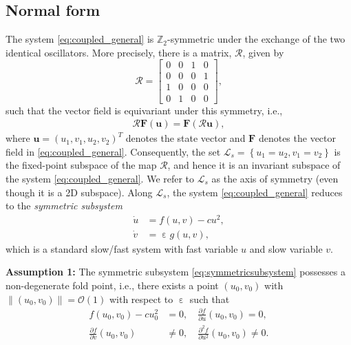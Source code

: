 \documentclass[10pt,onecolumn]{article}
\theoremstyle{plain}
\DeclareMathOperator{\eps}{\varepsilon}
\begin{document}
\subsection{Normal form}  \label{subsec:normalform}
The system \eqref{eq:coupled_general} is $\mathbb Z_2$-symmetric under the exchange of the two identical oscillators. More precisely, there is a matrix, $\mathcal R$, given by
%
\[ \mathcal R = \begin{bmatrix} 0 & 0 & 1 & 0 \\ 0 & 0 & 0 & 1 \\ 1 & 0 & 0 & 0 \\ 0 & 1 & 0 & 0 \end{bmatrix}, \]
%
such that the vector field is equivariant under this symmetry, i.e.,
%
\begin{equation} \label{eq:symmetry}
  \begin{split}
    \mathcal R \boldsymbol F(\boldsymbol u) = \boldsymbol F(\mathcal R \boldsymbol u),
  \end{split}
\end{equation}
%
where $\boldsymbol u = (u_1,v_1,u_2,v_2)^T$ denotes the state vector and $\boldsymbol F$ denotes the vector field in \eqref{eq:coupled_general}.  
Consequently, the set $\mathcal L_s = \left\{  u_1=u_2, v_1=v_2 \right\}$ is the fixed-point subspace of the map $\mathcal R$, and hence it is an invariant subspace of the system \eqref{eq:coupled_general}. We refer to $\mathcal L_s$ as the axis of symmetry (even though it is a 2D subspace). Along $\mathcal L_s$, the system \eqref{eq:coupled_general} reduces to the {\em symmetric subsystem}
%
\begin{equation} \label{eq:symmetricsubsystem}
  \begin{split}
    \dot u &= f(u,v) - c u^2, \\ 
    \dot v &= \eps g(u,v),
  \end{split}
\end{equation}
%
which is a standard slow/fast system with fast variable $u$ and slow variable $v$.

{\bf Assumption 1:} The symmetric subsystem \eqref{eq:symmetricsubsystem} possesses a non-degenerate fold point, i.e., there exists a point $(u_0,v_0)$ with $\lVert (u_0,v_0) \rVert = \mathcal{O}(1)$ with respect to $\eps$ such that 
%
\begin{equation}
  \begin{split}
    f(u_0,v_0)-c u_0^2 &= 0, \quad 
    \frac{\partial f}{\partial u}(u_0,v_0) = 0, \\ 
    \frac{\partial f}{\partial v}(u_0,v_0) &\neq 0, \quad
    \frac{\partial^2 f}{\partial u^2}(u_0,v_0) \neq 0.
  \end{split}
\end{equation}
%
\end{document}
